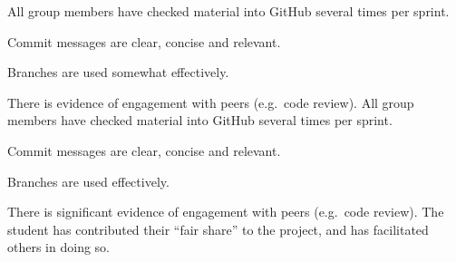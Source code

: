 \documentclass{../fal_assignment}
\begin{document}
\begin{markingrubric}
        \grade All group members have checked material into GitHub several times per sprint.
            \par Commit messages are clear, concise and relevant.
            \par Branches are used somewhat effectively.
            \par There is evidence of engagement with peers (e.g.\ code review).
        \grade All group members have checked material into GitHub several times per sprint.
            \par Commit messages are clear, concise and relevant.
            \par Branches are used effectively.
            \par There is significant evidence of engagement with peers (e.g.\ code review).
        \grade The student has contributed their ``fair share'' to the project,
            and has facilitated others in doing so.
\end{markingrubric}
\end{document}
